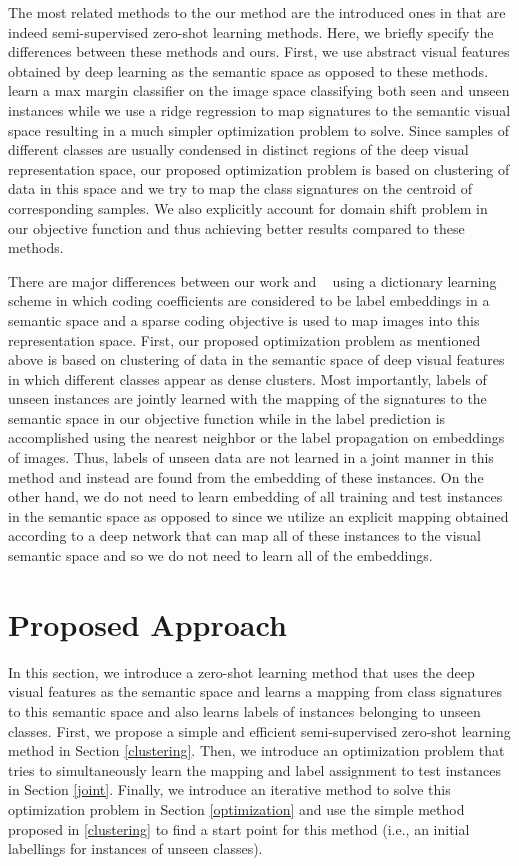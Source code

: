 \documentclass[10pt,twocolumn,letterpaper]{article}
\begin{document}
 The most related methods to the our method are the introduced ones in \cite{li15max, semi15, Kodirov2015} that are indeed semi-supervised zero-shot learning methods. Here, we briefly specify the differences between these methods and ours. First, we use abstract visual features obtained by deep learning as the semantic space as opposed to these methods. \cite{li15max, semi15}
learn a max margin classifier on the image space classifying both seen and unseen instances while we use a ridge regression to map signatures to the semantic visual space resulting in a much simpler optimization problem to solve. Since samples of different classes are usually condensed in distinct regions of the deep visual representation space, our proposed optimization problem is based on clustering of data in this space and we try to map the class signatures on the centroid of corresponding samples. We also explicitly account for domain shift problem in our objective function and thus achieving better results compared to these methods.

There are major differences between our work and ~\cite{Kodirov2015} using a dictionary learning scheme in which coding coefficients are considered to be label embeddings in a semantic space and a sparse coding objective is used to map images into this representation space. First, our proposed optimization problem as mentioned above is based on clustering of data in the semantic space of deep visual features in which different classes appear as dense clusters. Most importantly, labels of unseen instances are jointly learned with the mapping of the signatures to the semantic space in our objective function while in \cite{Kodirov2015} the label prediction is accomplished using the nearest neighbor or the label propagation on embeddings of images. Thus, labels of unseen data are not learned in a joint manner in this method and instead are found from the embedding of these instances. On the other hand, we do not need to learn embedding of all training and test instances in the semantic space as opposed to \cite{Kodirov2015} since we utilize an explicit mapping obtained according to a deep network that can map all of these instances to the visual semantic space and so we do not need to learn all of the embeddings.

\section{Proposed Approach} \label{proposed}
In this section, we introduce a zero-shot learning method that uses the deep visual features as the semantic space and learns
a mapping from class signatures to this semantic space and also learns labels of instances belonging to unseen classes.
 First, we propose a simple and efficient semi-supervised zero-shot learning method in Section \ref{clustering}.
  Then, we introduce an optimization problem that tries to simultaneously learn the mapping and label assignment to test instances in Section \ref{joint}.
   Finally, we introduce an iterative method to solve this optimization problem in Section \ref{optimization}
   and use the simple method proposed in \ref{clustering} to find a start point for this method (i.e., an initial labellings for instances of unseen classes).
\end{document}
